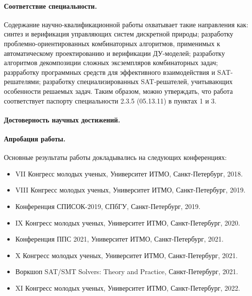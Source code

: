 \paragraph*{Соответствие специальности.}
%
Содержание научно-квалификационной работы охватывает такие направления как: синтез и верификация управляющих систем дискретной природы; разработку проблемно-ориентированных комбинаторных алгоритмов, применимых к автоматическому проектированию и верификации ДУ-моделей; разработку алгоритмов декомпозиции сложных эксземпляров комбинаторных задач; разрработку программных средств для эффективного взаимодействия и SAT-решателями; разработку специализированных SAT-решателей, учитывающих особенности решаемых задач.
Таким образом, можно утверждать, что работа соответствует паспорту специальности 2.3.5 (05.13.11) в пунктах 1 и 3.


\paragraph*{Достоверность научных достижений.}



\paragraph*{Апробация работы.}
%
Основные результаты работы докладывались на следующих конференциях:
\begin{itemize}[beginpenalty=10000]
    \item VII Конгресс молодых ученых, Университет ИТМО, Санкт-Петербург, 2018.
    \item VIII Конгресс молодых ученых, Университет ИТМО, Санкт-Петербург, 2019.
    \item Конференция СПИСОК-2019, СПбГУ, Санкт-Петербург, 2019.
    \item IX Конгресс молодых ученых, Университет ИТМО, Санкт-Петербург, 2020.
    \item Конференция ППС 2021, Университет ИТМО, Санкт-Петербург, 2021.
    \item X Конгресс молодых ученых, Университет ИТМО, Санкт-Петербург, 2021.
    \item Воркшоп SAT/SMT Solvers: Theory and Practice, Санкт-Петербург, 2021.
    \item XI Конгресс молодых ученых, Университет ИТМО, Санкт-Петербург, 2022.
\end{itemize}

